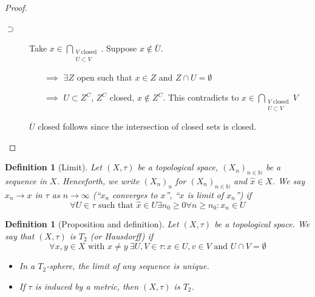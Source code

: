\documentclass[a4paper]{article}
\newcounter{lecref}[section]
\numberwithin{lecref}{section}
\newtheorem{definition}[lecref]{Definition}
\begin{document}
\begin{proof}
\begin{enumerate}
\begin{description}
				\item[$\supset$]
					Take $x \in \bigcap_{\substack{V \text{ closed} \\ U \subset V}}$. Suppose $x \not\in \overline U$.
					\begin{itemize}
						\item[$\implies$] $\exists Z$ open such that $x \in Z$ and $Z \cap U = \emptyset$
						\item[$\implies$] $U \subset Z^C$, $Z^C$ closed, $x \not\in Z^C$. This contradicts to $x \in \bigcap_{\substack{V \text{ closed} \\ U \subset V}} V$
					\end{itemize}
					$\overline U$ closed follows since the intersection of closed sets is closed.
			\end{description}
	\end{enumerate}
\end{proof}

\begin{definition}[Limit]
	\label{definition:1.7}
	Let $(X, \tau)$ be a topological space, $(X_n)_{n \in \mathbb N}$ be a sequence in $X$. Henceforth, we write $(X_n)_{n}$ for $(X_n)_{n \in \mathbb N}$ and $\hat x \in X$. We say $x_n \to x$ in $\tau$ as $n \to \infty$ (\enquote{$x_n$ converges to $x$}, \enquote{$x$ is limit of $x_n$}) if
	\[ \forall U \in \tau \text{ such that } \hat x \in U \exists n_0 \geq 0 \forall n \geq n_0: x_n \in U \]
\end{definition}

\begin{definition}[Proposition and definition]
	\label{definition:1.8}
	Let $(X, \tau)$ be a topological space. We say that $(X, \tau)$ is $T_2$ (or Hausdorff) if 
	\[ \forall x, y \in X \text{ with } x \neq y \: \exists U, V \in \tau: x \in U, v \in V \text{ and } U \cap V = \emptyset \]
	\begin{itemize}
		\item In a $T_2$-sphere, the limit of any sequence is unique.
		\item If $\tau$ is induced by a metric, then $(X, \tau)$ is $T_2$.
	\end{itemize}
\end{definition}
\end{document}
